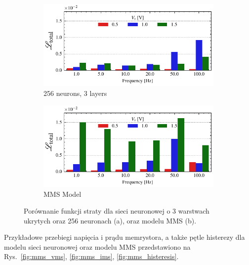 \documentclass[11pt, oneside]{article}
\begin{document}
\begin{figure}[httbp!]
    \begin{subfigure}[c]{0.48\linewidth}
        \centering
        \includegraphics[width=\linewidth]{mms_results/loss_per_freq_256 neurons, 3 layers.pdf}
        \caption{256 neurons, 3 layers}
    \end{subfigure}
    \begin{subfigure}[c]{0.48\linewidth}
        \centering
        \includegraphics[width=\linewidth]{mms_results/loss_per_freq_MMS Model.pdf}
        \caption{MMS Model}
    \end{subfigure}
    \caption{Porównanie funkcji straty dla sieci neuronowej o 3 warstwach ukrytych oraz 256 neuronach (a), oraz modelu MMS (b).}
    \label{fig:comparison_mms}
\end{figure}

Przykładowe przebiegi napięcia i prądu memrystora, a także pętle histerezy dla modelu sieci neuronowej oraz modelu MMS przedstawiono na Rys.~\ref{fig:mms_vms}, \ref{fig:mms_ims}, \ref{fig:mms_histeresis}.
\end{document}
